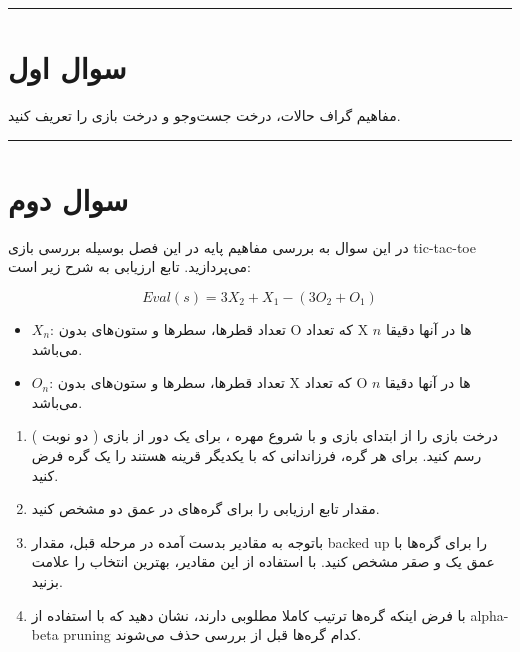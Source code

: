\documentclass[a4paper,10pt]{article}
\begin{document}
\vspace{8pt}
\textcolor{AccentCyan}{\rule{\linewidth}{0.8pt}}
\section{\textcolor{AccentGold}{سوال اول}}

مفاهیم گراف حالات، درخت جست‌وجو و درخت بازی را تعریف کنید. 

\bigskip
\bigskip
\textcolor{AccentCyan}{\rule{\linewidth}{0.4pt}}
\section{\textcolor{AccentGold}{سوال دوم}}

در این سوال به بررسی مفاهیم پایه در این فصل بوسیله بررسی بازی tic-tac-toe می‌پردازید. تابع ارزیابی  به شرح زیر است:

\begin{infobox}
	\[
	Eval(s) = 3X_2 + X_1 - ( 3O_2 + O_1 )
	\]
	
	\begin{itemize}
		\item 
		\(X_n\): 
		تعداد قطرها، سطرها و ستون‌های بدون O که تعداد X ها در آنها دقیقا \(n\) می‌باشد.
		
		\item 
		\(O_n\): 
		تعداد قطرها، سطرها و ستون‌های بدون X که تعداد O ها در آنها دقیقا \(n\) می‌باشد.
	\end{itemize}
	
\end{infobox}

\begin{enumerate}
	\renewcommand{\labelenumi}{\textcolor{AccentCyan}{\arabic{enumi})}}
	\item 
	درخت بازی را از ابتدای بازی و با شروع مهره  ، برای یک دور از بازی‌ ( دو نوبت ) رسم کنید. برای هر گره، فرزاندانی که با یکدیگر قرینه هستند را یک گره فرض کنید.  
	\item 
	مقدار تابع ارزیابی را برای گره‌های در عمق دو مشخص کنید.
	\item 
	باتوجه به مقادیر بدست آمده در مرحله قبل، مقدار backed up را برای گره‌ها با عمق یک و صقر مشخص کنید. با استفاده از این مقادیر، بهترین انتخاب را علامت بزنید. 
	\item 
	با فرض اینکه گره‌ها ترتیب کاملا مطلوبی دارند، نشان دهید که با استفاده از alpha-beta pruning کدام گره‌ها قبل از بررسی حذف می‌شوند. 
\end{enumerate}
\end{document}
